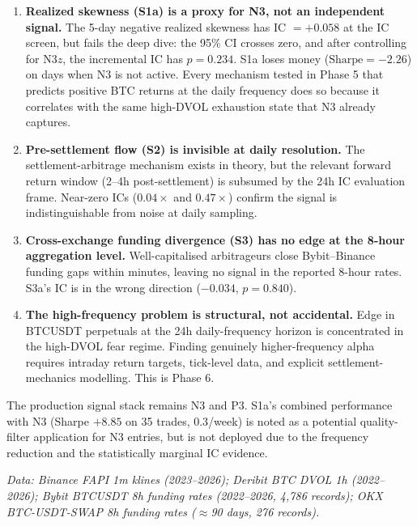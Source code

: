 \documentclass[12pt, a4paper]{article}
\theoremstyle{plain}
\theoremstyle{definition}
\begin{document}
\begin{enumerate}
  \item \textbf{Realized skewness (S1a) is a proxy for N3, not an
        independent signal.}  The 5-day negative realized skewness has IC
        $= +0.058$ at the IC screen, but fails the deep dive: the 95\%
        CI crosses zero, and after controlling for N3$z$, the incremental
        IC has $p = 0.234$.  S1a loses money ($\text{Sharpe} = -2.26$)
        on days when N3 is not active.  Every mechanism tested in Phase 5
        that predicts positive BTC returns at the daily frequency does so
        because it correlates with the same high-DVOL exhaustion state
        that N3 already captures.

  \item \textbf{Pre-settlement flow (S2) is invisible at daily resolution.}
        The settlement-arbitrage mechanism exists in theory, but the
        relevant forward return window (2--4h post-settlement) is
        subsumed by the 24h IC evaluation frame.  Near-zero ICs ($0.04\times$
        and $0.47\times$) confirm the signal is indistinguishable from
        noise at daily sampling.

  \item \textbf{Cross-exchange funding divergence (S3) has no edge at
        the 8-hour aggregation level.}  Well-capitalised arbitrageurs
        close Bybit--Binance funding gaps within minutes, leaving no
        signal in the reported 8-hour rates.  S3a's IC is in the wrong
        direction ($-0.034$, $p = 0.840$).

  \item \textbf{The high-frequency problem is structural, not accidental.}
        Edge in BTCUSDT perpetuals at the 24h daily-frequency horizon
        is concentrated in the high-DVOL fear regime.  Finding genuinely
        higher-frequency alpha requires intraday return targets, tick-level
        data, and explicit settlement-mechanics modelling.  This is Phase 6.
\end{enumerate}

The production signal stack remains N3 and P3.  S1a's combined performance
with N3 (Sharpe $+8.85$ on 35 trades, $0.3$/week) is noted as a
potential quality-filter application for N3 entries, but is not deployed
due to the frequency reduction and the statistically marginal IC evidence.

\vspace{1em}
\noindent\textit{Data: Binance FAPI 1m klines (2023--2026); Deribit BTC
DVOL 1h (2022--2026); Bybit BTCUSDT 8h funding rates (2022--2026,
4{,}786 records); OKX BTC-USDT-SWAP 8h funding rates ($\approx$90 days,
276 records).}
\end{document}
